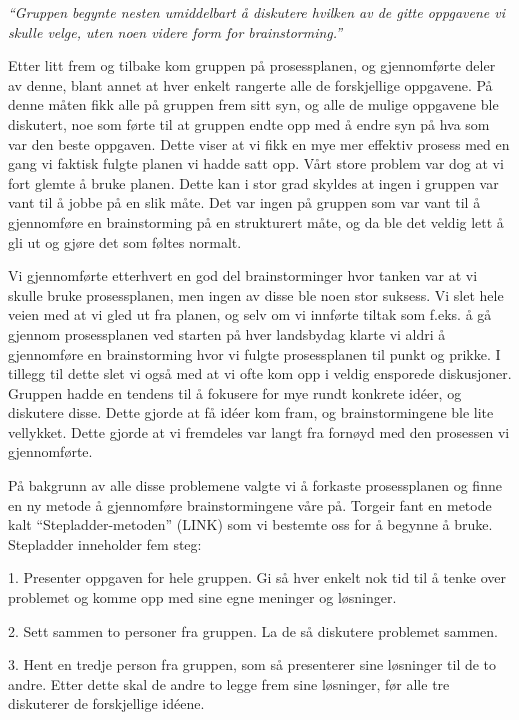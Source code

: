 \emph{“Gruppen begynte nesten umiddelbart å diskutere hvilken av de gitte oppgavene vi skulle velge, uten noen videre form for brainstorming.”} \newline

Etter litt frem og tilbake kom gruppen på prosessplanen, og gjennomførte deler av denne, blant annet at hver enkelt rangerte alle de forskjellige oppgavene. På denne måten fikk alle på gruppen frem sitt syn, og alle de mulige oppgavene ble diskutert, noe som førte til at gruppen endte opp med å endre syn på hva som var den beste oppgaven. Dette viser at vi fikk en mye mer effektiv prosess med en gang vi faktisk fulgte planen vi hadde satt opp. Vårt store problem var dog at vi fort glemte å bruke planen. Dette kan i stor grad skyldes at ingen i gruppen var vant til å jobbe på en slik måte. Det var ingen på gruppen som var vant til å gjennomføre en brainstorming på en strukturert måte, og da ble det veldig lett å gli ut og gjøre det som føltes normalt.

Vi gjennomførte etterhvert en god del brainstorminger hvor tanken var at vi skulle bruke prosessplanen, men ingen av disse ble noen stor suksess. Vi slet hele veien med at vi gled ut fra planen, og selv om vi innførte tiltak som f.eks. å gå gjennom prosessplanen ved starten på hver landsbydag klarte vi aldri å gjennomføre en brainstorming hvor vi fulgte prosessplanen til punkt og prikke. I tillegg til dette slet vi også med at vi ofte kom opp i veldig ensporede diskusjoner. Gruppen hadde en tendens til å fokusere for mye rundt konkrete idéer, og diskutere disse. Dette gjorde at få idéer kom fram, og brainstormingene ble lite vellykket. Dette gjorde at vi fremdeles var langt fra fornøyd med den prosessen vi gjennomførte.

På bakgrunn av alle disse problemene valgte vi å forkaste prosessplanen og finne en ny metode å gjennomføre brainstormingene våre på. Torgeir fant en metode kalt “Stepladder-metoden” (LINK) som vi bestemte oss for å begynne å bruke. Stepladder inneholder fem steg: \newline

1. Presenter oppgaven for hele gruppen. Gi så hver enkelt nok tid til å tenke over problemet og komme opp med sine egne meninger og løsninger.\newline

2. Sett sammen to personer fra gruppen. La de så diskutere problemet sammen.\newline

3. Hent en tredje person fra gruppen, som så presenterer sine løsninger til de to andre. Etter dette skal de andre to legge frem sine løsninger, før alle tre diskuterer de forskjellige idéene. \newline

